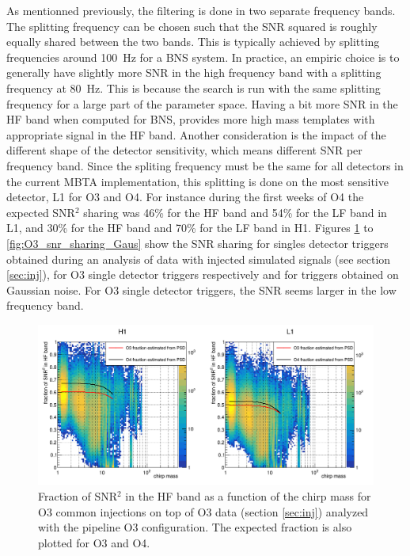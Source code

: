 As mentionned previously, the filtering is done in two separate frequency bands.
The splitting frequency can be chosen such that the SNR squared is roughly equally shared between the two bands.
This is typically achieved by splitting frequencies around \SI{100}{\hertz} for a BNS system.
In practice, an empiric choice is to generally have slightly more SNR in the high frequency band with a splitting frequency at \SI{80}{Hz}.
This is because the search is run with the same splitting frequency for a large part of the parameter space.
Having a bit more SNR in the HF band when computed for BNS, provides more high mass templates with appropriate signal in the HF band.
Another consideration is the impact of the  different shape of the detector sensitivity, which means different SNR per frequency band.
Since the spliting frequency must be the same for all detectors in the current MBTA implementation, this splitting is done on the most sensitive detector, L1 for O3 and O4.
For instance during the first weeks of O4 the expected SNR$^2$ sharing was 46\% for the HF band and 54\% for the LF band in L1, and 30\% for the HF band and 70\% for the LF band in H1.
Figures \ref{fig:O3_snr_sharing_inj} to \ref{fig:O3_snr_sharing_Gaus} show the SNR sharing for singles detector triggers obtained during an analysis of data with injected simulated signals (see section \ref{sec:inj}), for O3 single detector triggers respectively and for triggers obtained on Gaussian noise.
For O3 single detector triggers, the SNR seems larger in the low frequency band.

\begin{figure}[ht]
  \centering
  \includegraphics[width=\textwidth]{sectionMBTA/cSnrFracMchirpInj.png}
  \caption{Fraction of SNR$^2$ in the HF band as a function of the chirp mass for O3 common injections on top of O3 data (section \ref{sec:inj}) analyzed with the pipeline O3 configuration. The expected fraction is also plotted for O3 and O4.}
  \label{fig:O3_snr_sharing_inj}
\end{figure}

